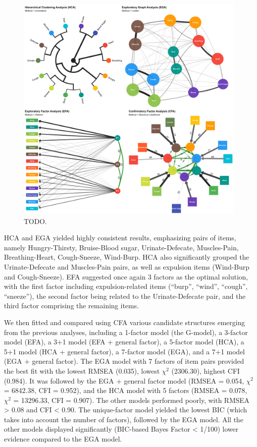 \documentclass[
  jou,
  floatsintext,
  longtable,
  nolmodern,
  notxfonts,
  notimes,
  colorlinks=true,linkcolor=blue,citecolor=blue,urlcolor=blue]{apa7}
\begin{document}
\begin{figure}[!htbp]

{\caption{{TODO.}{\label{fig-structure}}}}

\includegraphics[width=1\linewidth,height=\textheight,keepaspectratio]{../../analysis/figures/Figure2.png}

\end{figure}

HCA and EGA yielded highly consistent results, emphasizing pairs of
items, namely Hungry-Thirsty, Bruise-Blood sugar, Urinate-Defecate,
Muscles-Pain, Breathing-Heart, Cough-Sneeze, Wind-Burp. HCA also
significantly grouped the Urinate-Defecate and Muscles-Pain pairs, as
well as expulsion items (Wind-Burp and Cough-Sneeze). EFA suggested once
again 3 factors as the optimal solution, with the first factor including
expulsion-related items (``burp'', ``wind'', ``cough'', ``sneeze''), the
second factor being related to the Urinate-Defecate pair, and the third
factor comprising the remaining items.

We then fitted and compared using CFA various candidate structures
emerging from the previous analyses, including a 1-factor model (the
G-model), a 3-factor model (EFA), a 3+1 model (EFA + general factor), a
5-factor model (HCA), a 5+1 model (HCA + general factor), a 7-factor
model (EGA), and a 7+1 model (EGA + general factor). The EGA model with
7 factors of item pairs provided the best fit with the lowest RMSEA
(0.035), lowest \(\chi^2\) (2306.30), highest CFI (0.984). It was
followed by the EGA + general factor model (RMSEA = 0.054, \(\chi^2\) =
6842.38, CFI = 0.952), and the HCA model with 5 factors (RMSEA = 0.078,
\(\chi^2\) = 13296.33, CFI = 0.907). The other models performed poorly,
with RMSEA \textgreater{} 0.08 and CFI \textless{} 0.90. The
unique-factor model yielded the lowest BIC (which takes into account the
number of factors), followed by the EGA model. All the other models
displayed significantly (BIC-based Bayes Factor \textless{} 1/100) lower
evidence compared to the EGA model.
\end{document}
